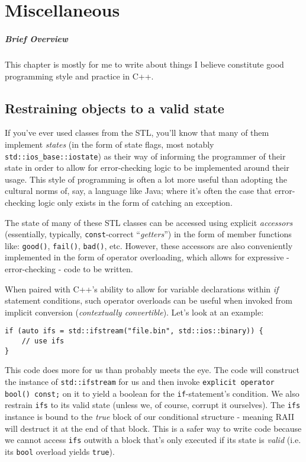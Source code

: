
\chapter{Miscellaneous}

	\paragraph{Brief Overview}

	This chapter is mostly for me to write about things I believe constitute
	good programming style and practice in C++.  

	\section{Restraining objects to a valid state}
		
		If you've ever used classes from the STL, you'll know that many of them
		implement \textit{states} (in the form of state flags, most notably
		\texttt{std::ios\_base::iostate}) as their way of informing the
		programmer of their state in order to allow for error-checking logic to
		be implemented around their usage. This style of programming is often a
		lot more useful than adopting the cultural norms of, say, a language
		like Java; where it's often the case that error-checking logic only
		exists in the form of catching an exception.
		
		The state of many of these STL classes can be accessed using explicit
		\textit{accessors} (essentially, typically, \texttt{const}-correct
		``\textit{getters}'') in the form of member functions like:
		\texttt{good()}, \texttt{fail()}, \texttt{bad()}, etc. However, these
		accessors are also conveniently implemented in the form of operator
		overloading, which allows for expressive - error-checking - code to be
		written.

		When paired with C++'s ability to allow for variable declarations within
		\textit{if} statement conditions, such operator overloads can be useful
		when invoked from implicit conversion (\textit{contextually
		convertible}). Let's look at an example:

		\begin{verbatim}
if (auto ifs = std::ifstream("file.bin", std::ios::binary)) {
	// use ifs
}
		\end{verbatim}

		This code does more for us than probably meets the eye. The code will
		construct the instance of \texttt{std::ifstream} for us and then invoke
		\texttt{explicit operator bool() const;} on it to yield a boolean for
		the \texttt{if}-statement's condition. We also restrain \texttt{ifs} to
		its valid state (unless we, of course, corrupt it ourselves). The
		\texttt{ifs} instance is bound to the \textit{true} block of our
		conditional structure - meaning RAII will destruct it at the end of that
		block. This is a safer way to write code because we cannot access
		\texttt{ifs} outwith a block that's only executed if its state is
		\textit{valid} (i.e. its \texttt{bool} overload yields \texttt{true}).
		


